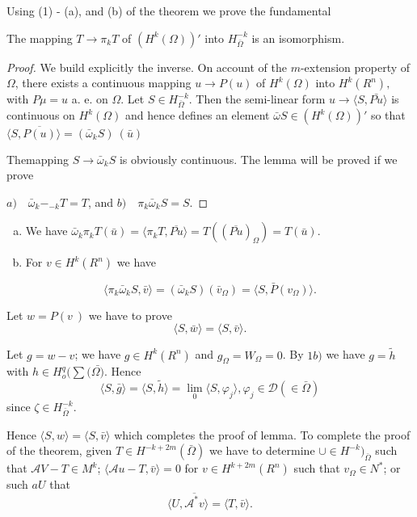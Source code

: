 Using (1) - (a), and (b) of the theorem we prove the fundamental
\begin{lemma*} %
  The mapping $T \to \pi_k T$ of $(H^k (\Omega))'$ into
  $H^{-k}_{\bar{\Omega}}$ is an isomorphism.  
\end{lemma*}

\begin{proof}%
  We build explicitly the inverse. On account of the $m$-extension
  property of $\Omega$, there exists a continuous mapping $u \to P(u)$
  of $H^k (\Omega)$ into $H^k (R^n), $ with $P \mu = u$ a. e.  on
  $\Omega$. Let $S \in H^{-k}_{\bar{\Omega}}$. Then the
  semi-linear form $u \to \langle S, \bar{Pu} \rangle$ is continuous on
  $H^k (\Omega)$ and hence defines an element $\bar{\omega} S
  \in (H^k (\Omega))'$ so that $\langle S, \overline{P (u)}
  \rangle = (\bar{\omega}_k S) ~ (\bar{u})$  
  
  The\pageoriginale mapping $S \to \bar{\omega}_k S$ is obviously continuous. The
  lemma will be proved if we prove 
  
  $ a) \quad \bar{\omega}_k - _{-k} T = T$, and $b) \quad \pi_{k}
  \bar{\omega}_k S = S$.  
\end{proof}

\begin{enumerate}[a)]
\item We have $\bar{\omega}_k \pi_k T(\bar{u}) = \langle \pi_k T,
  \overline{Pu} \rangle = T((\overline{Pu})_\Omega) = T (\bar{u})$.  
\item For $v \in H^k (R^n)$ we have
\end{enumerate}
$$
\langle \pi_k \bar{\omega}_k S, \bar{v} \rangle = (\bar{\omega}_k
S)(\bar{v}_{\Omega}) = \langle S, \bar{P} (v_\Omega) \rangle.  
$$

Let $w = P(v ~ )$ we have to prove
$$
\langle S, \bar{w} \rangle = \langle S, \bar{v} \rangle. 
$$

Let $g = w - v$; we have $g \in H^k (R^n)$ and $g_\Omega =
W_\Omega = 0$. By $1 b)$ we have $g = \tilde{h} $ with $h \in
H^q_o ( \sum (\bar{\Omega)}$. Hence 
$$
\langle S, \bar{g} \rangle = \langle S, \tilde{h } \rangle =
\lim\limits_{0} \langle S, \varphi_j \rangle, \varphi_j \in
\mathscr{D} (\in \bar{\Omega}) 
$$
since $\zeta \in H^{-k}_{\bar{\Omega}}$. 

Hence $\langle S, w \rangle = \langle S, \bar{v} \rangle$ which
completes the proof of lemma. To complete the proof of the theorem,
given $ T \in H^{-k + 2m}(\bar{\Omega})$ we have to determine
$\cup \in H^{-k})_{\bar{\Omega}} $ such that $\mathscr{A} V - T
\in M^k$; $\langle \mathscr{A}u - T, \bar{v} \rangle = 0$ for
$v \in H^{k+2m}(R^n)$ such that $v_\Omega \in N^*$; or
such $aU$ that  
\begin{equation*}
  \langle U, \overline{\mathscr{A}^* v} \rangle = \langle{T, \bar{v}}
  \rangle. \tag{1}\label{lec19:sec10:subsec3:eq1} 
\end{equation*}

